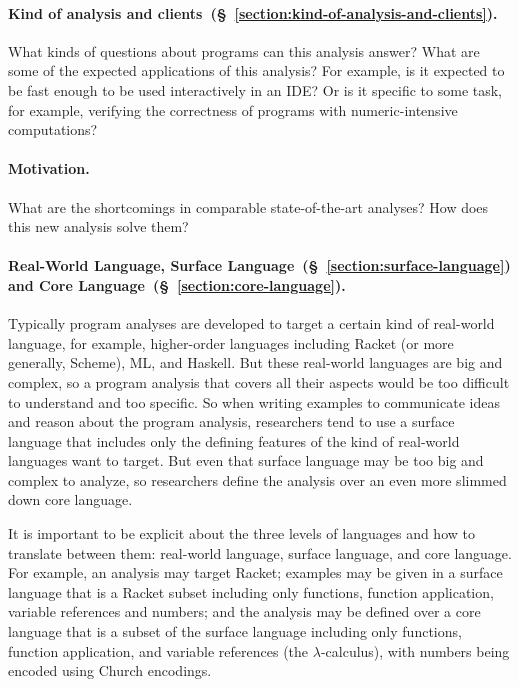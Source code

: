 \documentclass[12pt, oneside]{book}
\begin{document}
\paragraph{Kind of analysis and clients~(§~\ref{section:kind-of-analysis-and-clients}).}

What kinds of questions about programs can this analysis answer? What are some of the expected applications of this analysis? For example, is it expected to be fast enough to be used interactively in an IDE? Or is it specific to some task, for example, verifying the correctness of programs with numeric-intensive computations?

\paragraph{Motivation.}

What are the shortcomings in comparable state-of-the-art analyses? How does this new analysis solve them?

\paragraph{Real-World Language, Surface Language~(§~\ref{section:surface-language}) and Core Language~(§~\ref{section:core-language}).}

Typically program analyses are developed to target a certain kind of real-world language, for example, higher-order languages including Racket (or more generally, Scheme), ML, and Haskell. But these real-world languages are big and complex, so a program analysis that covers all their aspects would be too difficult to understand and too specific. So when writing examples to communicate ideas and reason about the program analysis, researchers tend to use a surface language that includes only the defining features of the kind of real-world languages want to target. But even that surface language may be too big and complex to analyze, so researchers define the analysis over an even more slimmed down core language.
  
It is important to be explicit about the three levels of languages and how to translate between them: real-world language, surface language, and core language. For example, an analysis may target Racket; examples may be given in a surface language that is a Racket subset including only functions, function application, variable references and numbers; and the analysis may be defined over a core language that is a subset of the surface language including only functions, function application, and variable references (the \(λ\)-calculus), with numbers being encoded using Church encodings.
\end{document}
